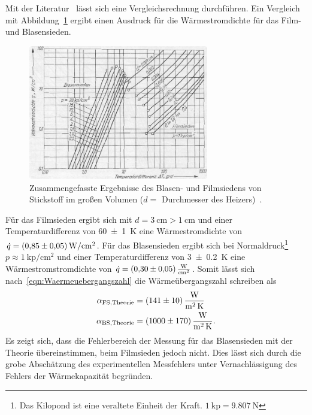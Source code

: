 \documentclass[parskip=half, a4paper,twoside,final]{article}
\begin{document}
Mit der Literatur~\cite{Fastowski} lässt sich eine Vergleichsrechnung durchführen. Ein Vergleich mit Abbildung~\ref{fig:Sieden_Stickstoff} ergibt einen Ausdruck für die Wärmestromdichte für das Film- und Blasensieden.
\begin{figure}[htp]
  \centering
  \includegraphics[width=0.7\textwidth]{Bilder/Sieden_Stickstoff.pdf}
  \caption{Zusammengefasste Ergebnisse des Blasen- und Filmsiedens von Stickstoff im großen Volumen ($d=$ Durchmesser des Heizers)~\cite[S.230]{Fastowski}.}
  \label{fig:Sieden_Stickstoff}
\end{figure}

Für das Filmsieden ergibt sich mit $d = \SI{3}{\centi\metre} > \SI{1}{\centi\metre}$ und einer Temperaturdifferenz von  \SI{60\pm 1}{\kelvin} eine Wärmestromdichte von $\dot{q} = \SI[per-mode=symbol]{0.85\pm 0.05}{\watt\per\centi\metre\squared}$. Für das Blasensieden ergibt sich bei Normaldruck\footnote{Das Kilopond ist eine veraltete Einheit der Kraft. $\SI{1}{\kilo\text{p}} = \SI{9.807}{\newton}$} $p \approx \SI{1}{\kilo\text{p}\per\centi\metre\squared}$ und einer Temperaturdifferenz von \SI{3\pm 0.2}{\kelvin} eine Wärmestromstromdichte von $\dot{q}= \SI{0.3 \pm 0.05}{\watt\per\centi\metre\squared}$. Somit lässt sich nach~\eqref{eqn:Waermeuebergangszahl} die Wärmeübergangszahl schreiben als
\begin{align}
  \alpha_\text{FS,Theorie} &=
  \SI{141\pm 10}{\watt\per\square\metre\per\kelvin}\\
  \alpha_\text{BS,Theorie} &=
  \SI{1000\pm 170}{\watt\per\square\metre\per\kelvin}.
\end{align}
Es zeigt sich, dass die Fehlerbereich der Messung für das Blasensieden mit der Theorie übereinstimmen, beim Filmsieden jedoch nicht. Dies lässt sich durch die grobe Abschätzung des experimentellen Messfehlers unter Vernachlässigung des Fehlers der Wärmekapazität begründen.
\end{document}
